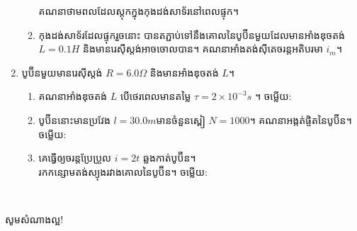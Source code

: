 \documentclass{officialexam}
\begin{document}
\begin{enumerate}[m]
\begin{enumerate}[k]
		គណនាថាមពលដែលស្តុកក្នុងកុងដង់សាទ័រនៅពេលផ្ទុក។
		\item កុងដង់សាទ័រដែលផ្ទុករួចនោះ បានតភ្ជាប់ទៅនឹងគោលនៃបូប៊ីនមួយដែលមានអាំងឌុចតង់ $L=0.1H$ និងមានរេសុីស្តង់អាចចោលបាន។ គណនាអាំងតង់សុីតេចរន្តអតិបរមា $i_m$។
	\end{enumerate}
	\item បូប៊ីនមួយមានរេសុីស្តង់ $R= 6.0\Omega$ និងមានអាំងឌុចតង់ $L$។
	\begin{enumerate}[k]
		\item គណនាអាំងឌុចតង់ $L$ បើថេរពេលមានតម្លៃ $\tau=2\times10^{-3}s$ ។ ចម្លើយ​: 
		\item បូប៊ីននោះមានប្រវែង $l=30.0m$​មានចំនួនស្ពៀ $N=1000$។ គណនាអង្កត់ផ្ចិតនៃបូប៊ីន។ ចម្លើយ​: 
		\item គេធ្វើឲ្យចរន្តប្រែប្រួល $i=2t$ ឆ្លងកាត់បូប៊ីន។\\
		រកកន្សោមតង់ស្យុងរវាងគោលនៃបូប៊ីន។ ចម្លើយ​: 
	\end{enumerate}
	\end{enumerate}
\\
\begin{center}
	\sffamily\color{blue}
	សូមសំណាងល្អ!
\end{center}\newpage
\end{document}
